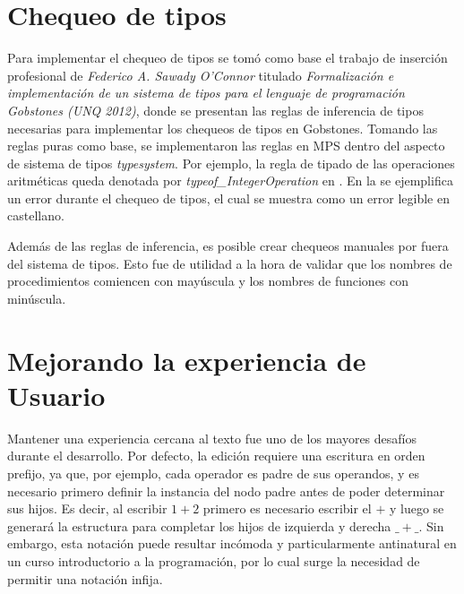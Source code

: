

\section{Chequeo de tipos}\label{chequeo}

Para implementar el chequeo de tipos se tomó como base el trabajo de inserción profesional de \textit{Federico A. Sawady O’Connor} titulado \textit{Formalización e implementación de un sistema de tipos para el lenguaje de programación Gobstones (UNQ 2012)}, donde se presentan las reglas de inferencia de tipos necesarias para implementar los chequeos de tipos en Gobstones. 
Tomando las reglas puras como base, se implementaron las reglas en MPS dentro del aspecto de sistema de tipos \textit{typesystem}. Por ejemplo, la regla de tipado de las operaciones aritméticas queda denotada por \textit{typeof\_IntegerOperation} en .
En la  se ejemplifica un error durante el chequeo de tipos, el cual se muestra como un error legible en castellano.


Además de las reglas de inferencia, es posible crear chequeos manuales por fuera del sistema de tipos. Esto fue de utilidad a la hora de validar que los nombres de procedimientos comiencen con mayúscula y los nombres de funciones con minúscula.

\section{Mejorando la experiencia de Usuario}\label{usabilidad}

Mantener una experiencia cercana al texto fue uno de los mayores desafíos durante el desarrollo. Por defecto, la edición requiere una escritura en orden prefijo, ya que, por ejemplo, cada operador es padre de sus operandos, y es necesario primero definir la instancia del nodo padre antes de poder determinar sus hijos.
Es decir, al escribir $1+2$ primero es necesario escribir el $+$ y luego se generará la estructura para completar los hijos de izquierda y derecha $\_ + \_$. Sin embargo, esta notación puede resultar incómoda y particularmente antinatural en un curso introductorio a la programación, por lo cual surge la necesidad de permitir una notación infija.

